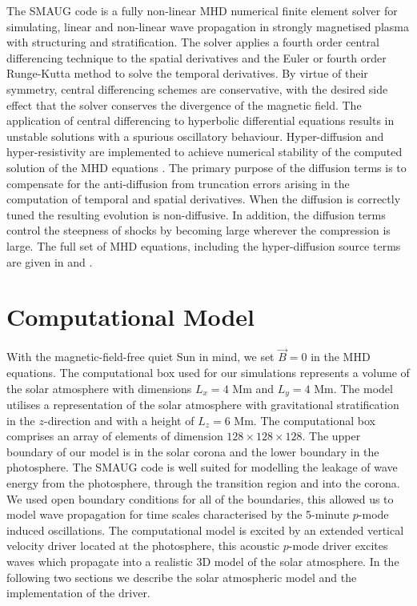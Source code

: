 \documentclass[preprint,authoryear,12pt]{elsarticle}
\begin{document}
The SMAUG code is a fully non-linear MHD numerical finite element solver for simulating, linear and non-linear wave propagation in strongly magnetised plasma with structuring and stratification. The solver applies a fourth order central differencing technique to the spatial derivatives and the Euler or fourth order Runge-Kutta method to solve the temporal derivatives. By virtue of their symmetry, central differencing schemes are conservative, with the desired side effect that the solver conserves the divergence of the magnetic field. The application of central differencing to hyperbolic differential equations results in unstable solutions with a spurious oscillatory behaviour.  Hyper-diffusion and hyper-resistivity are implemented to achieve numerical stability of the computed solution of the MHD equations \citep[see for example][]{Caunt2001}.  The primary purpose of the diffusion terms is to compensate for the anti-diffusion from truncation errors arising in the computation of temporal and spatial derivatives. When the diffusion is correctly tuned the resulting evolution is non-diffusive. In addition, the diffusion terms control the steepness of shocks by becoming large wherever the compression is large. The full set of MHD equations, including the hyper-diffusion source terms are given in \citet{Griffiths2015} and \citet{Shelyag2008}.

\section{Computational Model}

With the magnetic-field-free quiet Sun in mind, we set $\vec{B}=0$ in the MHD equations.  The computational box used for our simulations represents a volume of the solar atmosphere  with dimensions $L_{ x}= 4$ Mm and $L_{y} =4$ Mm. The model utilises a representation of the solar atmosphere with gravitational stratification in the $z$-direction and with a height of $L_{z} =6$ Mm. The computational box comprises an array of elements of dimension $128 \times128 \times128$. The upper boundary of our model  is in the solar corona and the lower boundary in the photosphere. The SMAUG code is well suited for modelling the leakage of wave energy from the photosphere, through the transition region and into the corona. We used open boundary conditions for all of the boundaries, this allowed us to model wave propagation for time scales characterised by the 5-minute $p$-mode induced oscillations. The computational model is excited by an extended vertical velocity driver located at the photosphere, this acoustic $p$-mode driver excites waves which propagate into a realistic 3D model of the solar atmosphere. In the following two sections we describe the solar atmospheric model and the implementation of the driver. 
\end{document}
